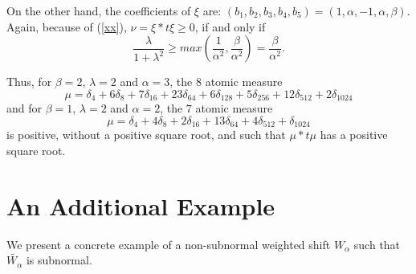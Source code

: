 \documentclass[12pt]{amsart}
\begin{document}
On the other hand, the coefficients of $\xi$ are: $(b_1,b_2,b_3,b_4,b_5)=(1,\alpha,-1,\alpha,\beta)$.
Again, because of (\ref{xx}), $\nu=\xi *t\xi\ge 0$, if and only if
 $$\frac{\lambda}{1+\lambda^2}\ge max(\frac{1}{\alpha^2},\frac{\beta}{\alpha^2})=\frac{\beta}{\alpha^2}. $$


    
Thus, for $\beta=2$, $\lambda = 2$ and $\alpha=3$, the $8$ atomic measure 
$$ \mu = \delta_{4} + 6 \delta_{8} + 7\delta_{16}  + 23\delta_{64} 
    + 6\delta_{128}  + 5\delta_{256} + 12\delta_{512} +2\delta_{1024}
$$
and for  $\beta=1$, $\lambda = 2$ and $\alpha=2$, the $7$ atomic measure 
$$ \mu = \delta_{4} + 4 \delta_{8} + 2\delta_{16} + 13\delta_{64} 
     + 4 \delta_{512} +\delta_{1024}
$$ is positive, without a positive square root, and such that  $\mu*t\mu$  has a positive square root.

\section{An Additional Example} 
We present a concrete example of a non-subnormal weighted shift $W_\alpha$ such that $\widetilde{W_\alpha}$ is subnormal. \ 
\end{document}
